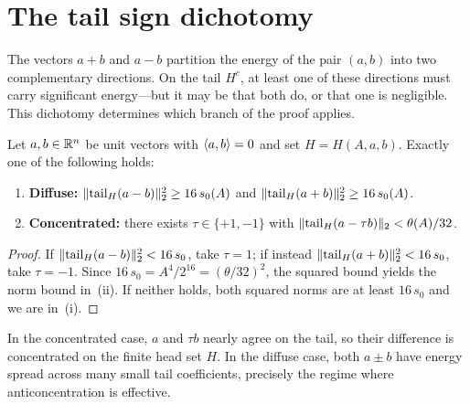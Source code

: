 \section{The tail sign dichotomy}\label{sec:dichotomy}

The vectors $a + b$ and $a - b$ partition the energy of the pair $(a,b)$
into two complementary directions. On the tail $H^c$, at least one of these
directions must carry significant energy---but it may be that both do, or that
one is negligible. This dichotomy determines which branch of the proof
applies.

\begin{lemma}\label{lem:tail-dichotomy}
Let $a, b \in \mathbb{R}^n$ be unit vectors with $\langle a,b\rangle = 0$ and set
$H = H(A,a,b)$. Exactly one of the following holds:
\begin{enumerate}[label=(\roman*)]
\item \textbf{Diffuse:}
$\lVert \operatorname{tail}_H(a - b) \rVert_2^2 \ge 16\, s_0(A)$ and
$\lVert \operatorname{tail}_H(a + b) \rVert_2^2 \ge 16\, s_0(A)$.

\item \textbf{Concentrated:}
there exists $\tau \in \{+1, -1\}$ with
$\lVert \operatorname{tail}_H(a - \tau b) \rVert_2 < \theta(A)/32$.
\end{enumerate}
\end{lemma}

\begin{proof}
If $\lVert \operatorname{tail}_H(a - b) \rVert_2^2 < 16\, s_0$, take $\tau = 1$; if instead
$\lVert \operatorname{tail}_H(a + b) \rVert_2^2 < 16\, s_0$, take $\tau = -1$. Since
$16\, s_0 = A^4/2^{16} = (\theta/32)^2$, the squared bound yields the norm
bound in~(ii). If neither holds, both squared norms are at least $16\, s_0$
and we are in~(i).
\end{proof}

\begin{remark}
In the concentrated case, $a$ and $\tau b$ nearly agree on the tail, so
their difference is concentrated on the finite head set $H$. In the diffuse
case, both $a \pm b$ have energy spread across many small tail coefficients,
precisely the regime where anticoncentration is effective.
\end{remark}
